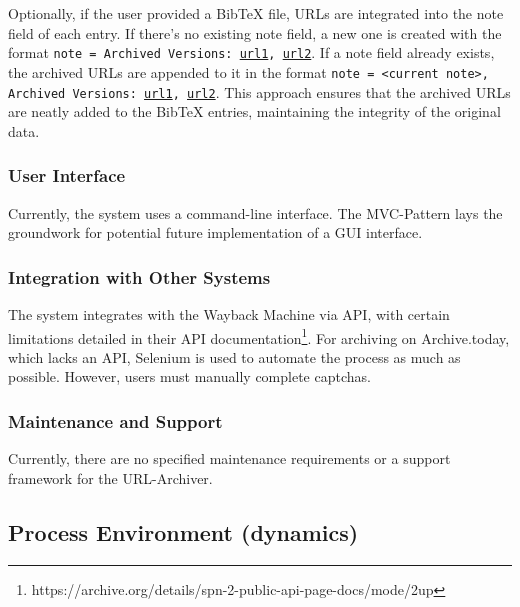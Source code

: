 Optionally, if the user provided a BibTeX file, URLs are integrated into the note field of each entry. If there's no existing note field, a new one is created with the format \texttt{note = {Archived Versions: \url{url1}, \url{url2}}}. If a note field already exists, the archived URLs are appended to it in the format \texttt{note = {<current note>, Archived Versions: \url{url1}, \url{url2}}}. This approach ensures that the archived URLs are neatly added to the BibTeX entries, maintaining the integrity of the original data.

\subsubsection{User Interface}
Currently, the system uses a command-line interface. The MVC-Pattern  lays the groundwork for potential future implementation of a GUI interface.

\subsubsection{Integration with Other Systems}
The system integrates with the Wayback Machine via API, with certain limitations detailed in their API documentation\footnote{https://archive.org/details/spn-2-public-api-page-docs/mode/2up}. For archiving on Archive.today, which lacks an API, Selenium  is used to automate the process as much as possible. However, users must manually complete captchas.

\subsubsection{Maintenance and Support}
Currently, there are no specified maintenance requirements or a support framework for the URL-Archiver.


\subsection{Process Environment (dynamics)}


